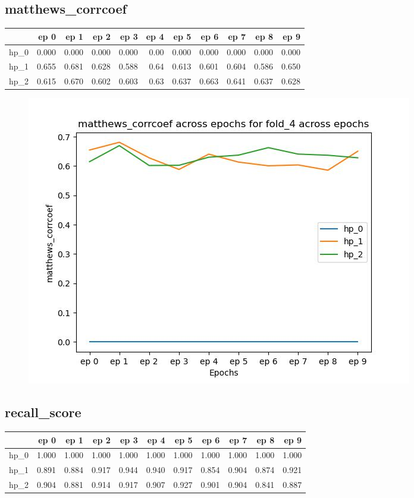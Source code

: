 \documentclass{article}
\begin{document}
\subsection{matthews\_corrcoef}
\begin{tabular}{lrrrrrrrrrr}
\toprule
{} &   ep 0 &   ep 1 &   ep 2 &   ep 3 &  ep 4 &   ep 5 &   ep 6 &   ep 7 &   ep 8 &   ep 9 \\
\midrule
hp\_0 &  0.000 &  0.000 &  0.000 &  0.000 &  0.00 &  0.000 &  0.000 &  0.000 &  0.000 &  0.000 \\
hp\_1 &  0.655 &  0.681 &  0.628 &  0.588 &  0.64 &  0.613 &  0.601 &  0.604 &  0.586 &  0.650 \\
hp\_2 &  0.615 &  0.670 &  0.602 &  0.603 &  0.63 &  0.637 &  0.663 &  0.641 &  0.637 &  0.628 \\
\bottomrule
\end{tabular}

\begin{figure}[H]
\includegraphics[scale = 0.75]{fold_4/matthews_corrcoef}
\end{figure}
\subsection{recall\_score}
\begin{tabular}{lrrrrrrrrrr}
\toprule
{} &   ep 0 &   ep 1 &   ep 2 &   ep 3 &   ep 4 &   ep 5 &   ep 6 &   ep 7 &   ep 8 &   ep 9 \\
\midrule
hp\_0 &  1.000 &  1.000 &  1.000 &  1.000 &  1.000 &  1.000 &  1.000 &  1.000 &  1.000 &  1.000 \\
hp\_1 &  0.891 &  0.884 &  0.917 &  0.944 &  0.940 &  0.917 &  0.854 &  0.904 &  0.874 &  0.921 \\
hp\_2 &  0.904 &  0.881 &  0.914 &  0.917 &  0.907 &  0.927 &  0.901 &  0.904 &  0.841 &  0.887 \\
\bottomrule
\end{tabular}
\end{document}
